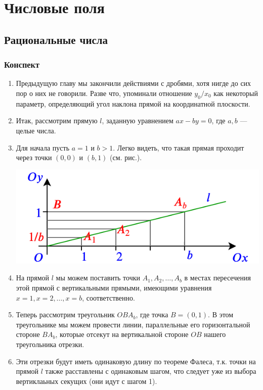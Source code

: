 \chapter{Числовые поля}

\section{Рациональные числа}

\subsection*{Конспект}
\begin{enumerate}
\item Предыдущую главу мы закончили действиями с дробями, хотя нигде до сих пор о них не говорили. Разве что, упоминали отношение $y_0/x_0$ как некоторый параметр, определяющий угол наклона прямой на координатной плоскости.
\item Итак, рассмотрим прямую $l$, заданную уравнением $ax-by=0$, где $a,b$ --- целые числа.
\item Для начала пусть $a=1$ и $b>1$. Легко видеть, что такая прямая проходит через точки $(0,0)$ и $(b,1)$ (см. рис.).
\begin{center}
\includegraphics[scale=0.5]{section.png}
\end{center}
\item На прямой $l$ мы можем поставить точки $A_1, A_2, \dots, A_b$ в местах пересечения этой прямой с вертикальными прямыми, имеющими уравнения $x=1, x=2, \dots, x=b$, соответственно.
\item Теперь рассмотрим треугольник $OBA_b$, где точка $B=(0,1)$. В этом треугольнике мы можем провести линии, параллельные его горизонтальной стороне $BA_b$, которые отсекут на вертикальной стороне $OB$ нашего треугольника отрезки.
\item Эти отрезки будут иметь одинаковую длину по теореме Фалеса, т.к. точки на прямой $l$ также расставлены с одинаковым шагом, что следует уже из выбора вертиклаьных секущих (они идут с шагом 1).

\end{enumerate}

